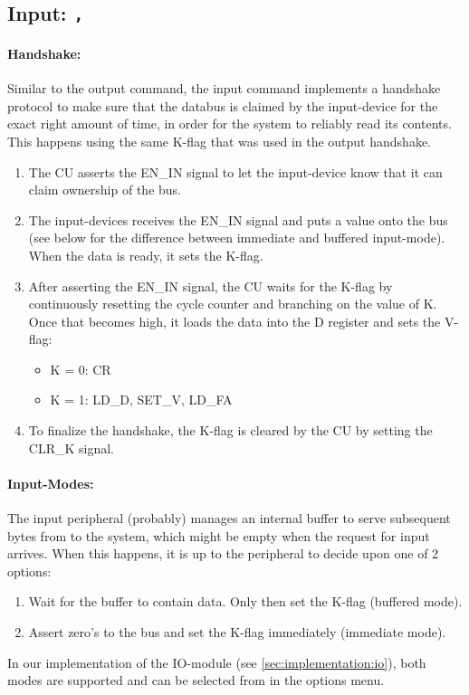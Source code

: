 \subsection{Input: \texttt{,}} \label{sec:sequences:input}
\paragraph{Handshake:} Similar to the output command, the input command implements a handshake protocol to make sure that the databus is claimed by the input-device for the exact right amount of time, in order for the system to reliably read its contents. This happens using the same K-flag that was used in the output handshake.
\begin{enumerate}
\item The CU asserts the EN\_IN signal to let the input-device know that it can claim ownership of the bus.
\item The input-devices receives the EN\_IN signal and puts a value onto the bus (see below for the difference between immediate and buffered input-mode). When the data is ready, it sets the K-flag.
\item After asserting the EN\_IN signal, the CU waits for the K-flag by continuously resetting the cycle counter and branching on the value of K. Once that becomes high, it loads the data into the D register and sets the V-flag:
  \begin{itemize}
  \item K = 0: CR
  \item K = 1: LD\_D, SET\_V, LD\_FA
  \end{itemize}
\item To finalize the handshake, the K-flag is cleared by the CU by setting the CLR\_K signal.  
\end{enumerate}

\paragraph{Input-Modes:} The input peripheral (probably) manages an internal buffer to serve subsequent bytes from to the system, which might be empty when the request for input arrives. When this happens, it is up to the peripheral to decide upon one of 2 options:
\begin{enumerate}
\item Wait for the buffer to contain data. Only then set the K-flag (buffered mode).
\item Assert zero's to the bus and set the K-flag immediately (immediate mode).
\end{enumerate}
In our implementation of the IO-module (see \ref{sec:implementation:io}), both modes are supported and can be selected from in the options menu.


